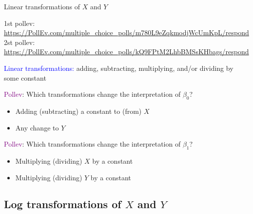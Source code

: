 \documentclass[10pt,t]{beamer}
\begin{document}
\begin{frame}{Linear transformations of $X$ and $Y$}
	

	\footnotesize{1st pollev: \url{https://PollEv.com/multiple_choice_polls/m780L9eZqkmodjWcUmKpL/respond}}
	\smallskip
	\footnotesize{2st pollev: \url{https://PollEv.com/multiple_choice_polls/kQ9FPtM2LhbBMSsKHbags/respond}}
		\medskip
	\small
	
\textcolor{blue}{Linear transformations:} adding, subtracting, multiplying, and/or dividing by some constant

\vspace{0.3cm}

\textcolor{purple}{Pollev}: Which transformations change the interpretation of $\beta_0$? \pause
\medskip
\begin{itemize}
	\item[] Adding (subtracting) a constant to (from) $X$
	\smallskip
	\item[] Any change to $Y$ 
\end{itemize} \pause

\vspace{0.3cm}

\textcolor{purple}{Pollev}: Which transformations change the interpretation of $\beta_1$? \pause
\medskip

\begin{itemize}
	\item[] Multiplying (dividing) $X$ by a constant
	\smallskip
	
	\item[] Multiplying (dividing) $Y$ by a constant 
	
\end{itemize}


\end{frame}



\subsection{Log transformations of $X$ and $Y$}
\end{document}
